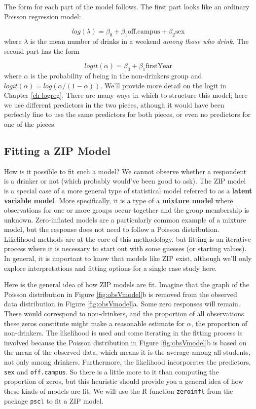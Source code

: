 \documentclass[
]{krantz}
\begin{document}
The form for each part of the model follows. The first part looks like an ordinary Poisson regression model:

\[
log(\lambda)=\beta_0+\beta_1\textrm{off.campus}+ \beta_2\textrm{sex}
\]
where \(\lambda\) is the mean number of drinks in a weekend \emph{among those who drink}.
The second part has the form

\[
logit(\alpha)=\beta_0+\beta_1\textrm{firstYear}
\]
where \(\alpha\) is the probability of being in the non-drinkers group and \(logit(\alpha) = log( \alpha/(1-\alpha))\). We'll provide more detail on the logit in Chapter \ref{ch-logreg}. There are many ways in which to structure this model; here we use different predictors in the two pieces, athough it would have been perfectly fine to use the same predictors for both pieces, or even no predictors for one of the pieces.

\subsection{Fitting a ZIP Model}\label{fitting-a-zip-model}

How is it possible to fit such a model? We cannot observe whether a respondent is a drinker or not (which probably would've been good to ask). The ZIP model is a special case of a more general type of statistical model referred to as a \textbf{latent variable model}. More specifically, it is a type of a \textbf{mixture model}  where observations for one or more groups occur together and the group membership is unknown. Zero-inflated models are a particularly common example of a mixture model, but the response does not need to follow a Poisson distribution. Likelihood methods are at the core of this methodology, but fitting is an iterative process where it is necessary to start out with some guesses (or starting values). In general, it is important to know that models like ZIP exist, although we'll only explore interpretations and fitting options for a single case study here.

Here is the general idea of how ZIP models are fit. Imagine that the graph of the Poisson distribution in Figure \ref{fig:obsVmodel}b is removed from the observed data distribution in Figure \ref{fig:obsVmodel}a. Some zero responses will remain. These would correspond to non-drinkers, and the proportion of all observations these zeros constitute might make a reasonable estimate for \(\alpha\), the proportion of non-drinkers. The likelihood is used and some iterating in the fitting process is involved because the Poisson distribution in Figure \ref{fig:obsVmodel}b is based on the mean of the observed data, which means it is the average among all students, not only among drinkers. Furthermore, the likelihood incorporates the predictors, \texttt{sex} and \texttt{off.campus}. So there is a little more to it than computing the proportion of zeros, but this heuristic should provide you a general idea of how these kinds of models are fit. We will use the R function \texttt{zeroinfl} from the package \texttt{pscl} to fit a ZIP model.
\end{document}
